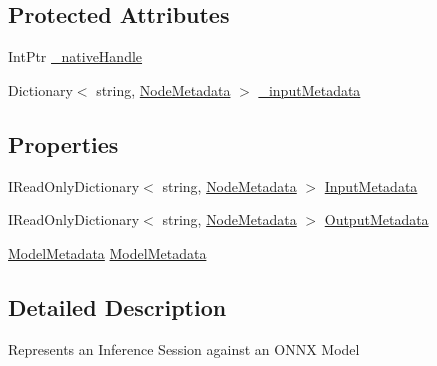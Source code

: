 \subsection*{Protected Attributes}
\begin{DoxyCompactItemize}
\item 
Int\+Ptr \mbox{\hyperlink{classMicrosoft_1_1ML_1_1OnnxRuntime_1_1InferenceSession_a1a027b8618f21d53010e5cd068c75b15}{\+\_\+native\+Handle}}
\item 
Dictionary$<$ string, \mbox{\hyperlink{structMicrosoft_1_1ML_1_1OnnxRuntime_1_1NodeMetadata}{Node\+Metadata}} $>$ \mbox{\hyperlink{classMicrosoft_1_1ML_1_1OnnxRuntime_1_1InferenceSession_ae6b54c8f160dcbbe9cee2012cf7bbcd8}{\+\_\+input\+Metadata}}
\end{DoxyCompactItemize}
\subsection*{Properties}
\begin{DoxyCompactItemize}
\item 
I\+Read\+Only\+Dictionary$<$ string, \mbox{\hyperlink{structMicrosoft_1_1ML_1_1OnnxRuntime_1_1NodeMetadata}{Node\+Metadata}} $>$ \mbox{\hyperlink{classMicrosoft_1_1ML_1_1OnnxRuntime_1_1InferenceSession_a8715860931b873d2f2d72b0cb650caa6}{Input\+Metadata}}
\item 
I\+Read\+Only\+Dictionary$<$ string, \mbox{\hyperlink{structMicrosoft_1_1ML_1_1OnnxRuntime_1_1NodeMetadata}{Node\+Metadata}} $>$ \mbox{\hyperlink{classMicrosoft_1_1ML_1_1OnnxRuntime_1_1InferenceSession_aaff8c90121e88c8003c5056c418717ae}{Output\+Metadata}}
\item 
\mbox{\hyperlink{structMicrosoft_1_1ML_1_1OnnxRuntime_1_1ModelMetadata}{Model\+Metadata}} \mbox{\hyperlink{classMicrosoft_1_1ML_1_1OnnxRuntime_1_1InferenceSession_a91867b5c07d9983372277ac483587e66}{Model\+Metadata}}
\end{DoxyCompactItemize}


\subsection{Detailed Description}
Represents an Inference Session against an O\+N\+NX Model 



